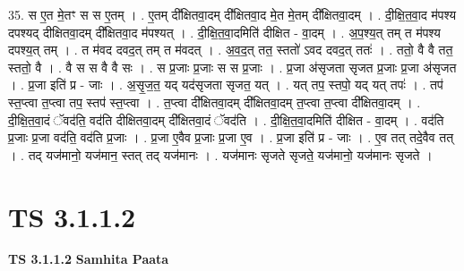 \documentclass[17pt]{extarticle}
\begin{document}
35. स ए॒त मे॒तꣳ स स ए॒तम् । . ए॒तम् दी᳚क्षितवा॒दम् दी᳚क्षितवा॒द मे॒त मे॒तम् दी᳚क्षितवा॒दम् । . दी॒क्षि॒त॒वा॒द म॑पश्य दपश्यद् दीक्षितवा॒दम् दी᳚क्षितवा॒द म॑पश्यत् । . दी॒क्षि॒त॒वा॒दमिति॑ दीक्षित - वा॒दम् । . अ॒प॒श्य॒त् तम् त म॑पश्य दपश्य॒त् तम् । . त म॑वद दवद॒त् तम् त म॑वदत् । . अ॒व॒द॒त् तत॒ स्ततो॑ ऽवद दवद॒त् ततः॑ । . ततो॒ वै वै तत॒ स्ततो॒ वै । . वै स स वै वै सः । . स प्र॒जाः प्र॒जाः स स प्र॒जाः । . प्र॒जा अ॑सृजता सृजत प्र॒जाः प्र॒जा अ॑सृजत । . प्र॒जा इति॑ प्र - जाः । . अ॒सृ॒ज॒त॒ यद् यद॑सृजता सृजत॒ यत् । . यत् तप॒ स्तपो॒ यद् यत् तपः॑ । . तप॑ स्त॒प्त्वा त॒प्त्वा तप॒ स्तप॑ स्त॒प्त्वा । . त॒प्त्वा दी᳚क्षितवा॒दम् दी᳚क्षितवा॒दम् त॒प्त्वा त॒प्त्वा दी᳚क्षितवा॒दम् । . दी॒क्षि॒त॒वा॒दं ॅवद॑ति॒ वद॑ति दीक्षितवा॒दम् दी᳚क्षितवा॒दं ॅवद॑ति । . दी॒क्षि॒त॒वा॒दमिति॑ दीक्षित - वा॒दम् । . वद॑ति प्र॒जाः प्र॒जा वद॑ति॒ वद॑ति प्र॒जाः । . प्र॒जा ए॒वैव प्र॒जाः प्र॒जा ए॒व । . प्र॒जा इति॑ प्र - जाः । . ए॒व तत् तदे॒वैव तत् । . तद् यज॑मानो॒ यज॑मान॒ स्तत् तद् यज॑मानः । . यज॑मानः सृजते सृजते॒ यज॑मानो॒ यज॑मानः सृजते । \newline
\pagebreak
{}

\section{ TS 3.1.1.2 }

\textbf{TS 3.1.1.2 } \newline
\textbf{Samhita Paata} \newline
\end{document}
